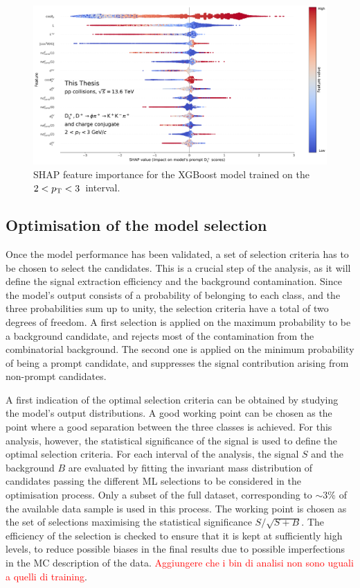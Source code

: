 \begin{figure}[htb]
    \centering
    \includegraphics[width=\textwidth]{Figures/Chapter 5/shap.pdf}
    \caption{SHAP feature importance for the XGBoost model trained on the $2<p_\mathrm{T}<3$~\gevc interval.}
    \label{fig:ml_feature_importance}
\end{figure}

\subsection{Optimisation of the model selection}
Once the model performance has been validated, a set of selection criteria has to be chosen to select the candidates. This is a crucial step of the analysis, as it will define the signal extraction efficiency and the background contamination. Since the model's output consists of a probability of belonging to each class, and the three probabilities sum up to unity, the selection criteria have a total of two degrees of freedom. A first selection is applied on the maximum probability to be a background candidate, and rejects most of the contamination from the combinatorial background. The second one is applied on the minimum probability of being a prompt \ds candidate, and suppresses the signal contribution arising from non-prompt \ds candidates. 

A first indication of the optimal selection criteria can be obtained by studying the model's output distributions. A good working point can be chosen as the point where a good separation between the three classes is achieved. For this analysis, however, the statistical significance of the signal is used to define the optimal selection criteria. For each \pt interval of the analysis, the signal $S$ and the background $B$ are evaluated by fitting the invariant mass distribution of candidates passing the different ML selections to be considered in the optimisation process. Only a subset of the full dataset, corresponding to $\sim 3\%$ of the available data sample is used in this process. The working point is chosen as the set of selections maximising the statistical significance $S/\sqrt{S+B}$. The efficiency of the selection is checked to ensure that it is kept at sufficiently high levels, to reduce possible biases in the final results due to possible imperfections in the MC description of the data. \textcolor{red}{Aggiungere che i bin di analisi non sono uguali a quelli di training}. 


